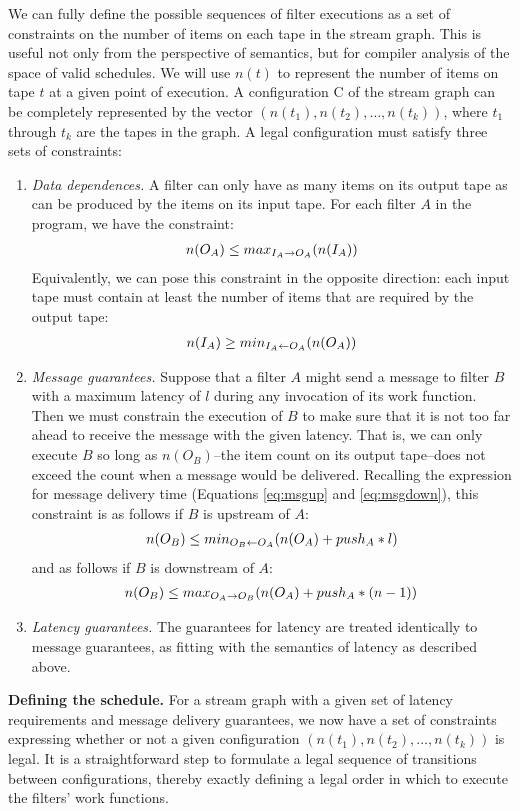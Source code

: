 We can fully define the possible sequences of filter executions as a
set of constraints on the number of items on each tape in the stream
graph.  This is useful not only from the perspective of semantics, but
for compiler analysis of the space of valid schedules.  We will use
$n(t)$ to represent the number of items on tape $t$ at a given point
of execution.  A configuration C of the stream graph can be completely
represented by the vector $(n(t_1), n(t_2), \dots, n(t_k))$, where
$t_1$ through $t_k$ are the tapes in the graph.  A legal configuration
must satisfy three sets of constraints:
\begin{enumerate}
\item {\it Data dependences.}  A filter can only have as many items on
its output tape as can be produced by the items on its input tape.
For each filter $A$ in the program, we have the constraint:
\begin{eqnarray*}
n(O_A) \le max_{I_A \rightarrow O_A}(n(I_A))
\end{eqnarray*}
Equivalently, we can pose this constraint in the opposite direction:
each input tape must contain at least the number of items that are
required by the output tape:
\begin{eqnarray*}
n(I_A) \ge min_{I_A \leftarrow O_A}(n(O_A))
\end{eqnarray*}
\item {\it Message guarantees.}  Suppose that a filter $A$ might send
a message to filter $B$ with a maximum latency of $l$ during any
invocation of its work function.  Then we must constrain the execution
of $B$ to make sure that it is not too far ahead to receive the
message with the given latency.  That is, we can only execute $B$ so
long as $n(O_B)$--the item count on its output tape--does not exceed
the count when a message would be delivered.  Recalling the expression
for message delivery time (Equations \ref{eq:msgup} and
\ref{eq:msgdown}), this constraint is as follows if $B$ is upstream of $A$:
\begin{eqnarray*}
n(O_B) \le min_{O_B \leftarrow O_A}(n(O_A) + push_A * l)
\end{eqnarray*}
and as follows if $B$ is downstream of $A$:
\begin{eqnarray*}
n(O_B) \le max_{O_A \rightarrow O_B}(n(O_A) + push_A * (n-1))
\end{eqnarray*}
\item {\it Latency guarantees.}  The guarantees for latency are
treated identically to message guarantees, as fitting with the
semantics of latency as described above.
\end{enumerate}
{\bf Defining the schedule.}  For a stream graph with a given set of
latency requirements and message delivery guarantees, we now have a
set of constraints expressing whether or not a given configuration
$(n(t_1), n(t_2), \dots, n(t_k))$ is legal.  It is a straightforward
step to formulate a legal sequence of transitions between
configurations, thereby exactly defining a legal order in which to
execute the filters' work functions.

